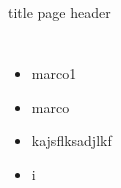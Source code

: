 \begin{frame}[c]{~}
    \begin{beamercolorbox}[wd=\textwidth,ht=\paperheight]{title page header}
    \end{beamercolorbox}%
    \centering

    \begin{columns}
        
            
            \begin{itemize}
                \item marco1
                \item marco 
                \item kajsflksadjlkf
                \item i
            \end{itemize}
    \end{columns}
  
 \end{frame}

